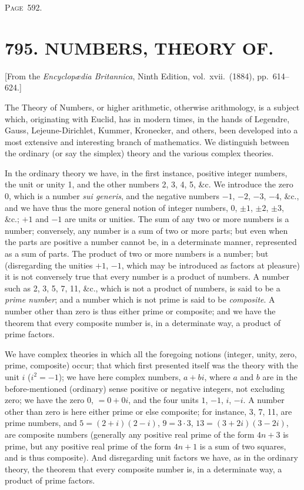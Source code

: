 \documentclass[11pt,a4paper]{book}
\begin{document}
\newpage
\noindent\textsc{Page~592.}

\section*{795. NUMBERS, THEORY OF.}

\begin{flushright}
\small[From the \textit{Encyclop{\ae}dia Britannica}, Ninth Edition, vol.~xvii.~(1884), pp.~614--624.]
\end{flushright}

The Theory of Numbers, or higher arithmetic, otherwise arithmology, is a subject which, originating with Euclid, has in modern times, in the hands of Legendre, Gauss, Lejeune-Dirichlet, Kummer, Kronecker, and others, been developed into a most extensive and interesting branch of mathematics. We distinguish between the ordinary (or say the simplex) theory and the various complex theories.

In the ordinary theory we have, in the first instance, positive integer numbers, the unit or unity 1, and the other numbers 2, 3, 4, 5, \&c. We introduce the zero 0, which is a number \textit{sui generis}, and the negative numbers $-1$, $-2$, $-3$, $-4$, \&c., and we have thus the more general notion of integer numbers, 0, $\pm 1$, $\pm 2$, $\pm 3$, \&c.; $+1$ and $-1$ are units or unities. The sum of any two or more numbers is a number; conversely, any number is a sum of two or more parts; but even when the parts are positive a number cannot be, in a determinate manner, represented as a sum of parts. The product of two or more numbers is a number; but (disregarding the unities $+1$, $-1$, which may be introduced as factors at pleasure) it is not conversely true that every number is a product of numbers. A number such as 2, 3, 5, 7, 11, \&c., which is not a product of numbers, is said to be a \textit{prime number}; and a number which is not prime is said to be \textit{composite}. A number other than zero is thus either prime or composite; and we have the theorem that every composite number is, in a determinate way, a product of prime factors.

We have complex theories in which all the foregoing notions (integer, unity, zero, prime, composite) occur; that which first presented itself was the theory with the unit $i$ ($i^2=-1$); we have here complex numbers, $a+bi$, where $a$ and $b$ are in the before-mentioned (ordinary) sense positive or negative integers, not excluding zero; we have the zero $0$, $=0+0i$, and the four units $1$, $-1$, $i$, $-i$. A number other than zero is here either prime or else composite; for instance, 3, 7, 11, are prime numbers, and $5=(2+i)(2-i)$, $9=3\cdot 3$, $13=(3+2i)(3-2i)$, are composite numbers (generally any positive real prime of the form $4n+3$ is prime, but any positive real prime of the form $4n+1$ is a sum of two squares, and is thus composite). And disregarding unit factors we have, as in the ordinary theory, the theorem that every composite number is, in a determinate way, a product of prime factors.
\end{document}
